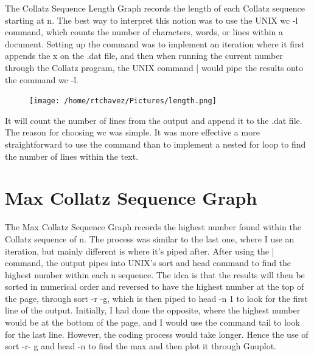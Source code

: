 \documentclass[11pt]{article} %
\begin{document}
\begin{flushleft}

The Collatz Sequence Length Graph records the length of each Collatz sequence starting at n.
The best way to interpret this notion was to use the UNIX wc -l command, which counts the 
number of characters, words, or lines within a document. Setting up the command was to implement
an iteration where it first appends the x on the .dat file, and then when running the current
number through the Collatz program, the UNIX command | would pipe the results onto the command 
wc -l.

\begin{figure}[htp]
\centering
\texttt{[image: /home/rtchavez/Pictures/length.png]}
\caption{}
\label{}
\end{figure}

 It will count the number of lines from the output and append it to the .dat file.
The reason for choosing wc was simple. It was more effective a more straightforward to use the 
command than to implement a nested for loop to find the number of lines within the text.

\end{flushleft}


\pagebreak
\section*{Max Collatz Sequence Graph}
The Max Collatz Sequence Graph records the highest number found within the Collatz sequence of n. 
The process was similar to the last one, where I use an iteration, but mainly different is where 
it's piped after. After using the | command, the output pipes into UNIX's sort and head command 
to find the highest number within each n sequence. 
The idea is that the results will then be 
sorted in numerical order and reversed to have the highest number at the top of the page, 
through sort -r -g, which is then piped to head -n 1 to look for the first line of the output. 
Initially, I had done the opposite, where the highest number would be at the bottom of the page,
and I would use the command tail to look for the last line. However, the coding process would take 
longer. 
Hence the use of sort -r- g and head -n to find the max and then plot it through Gnuplot.
\end{document}
